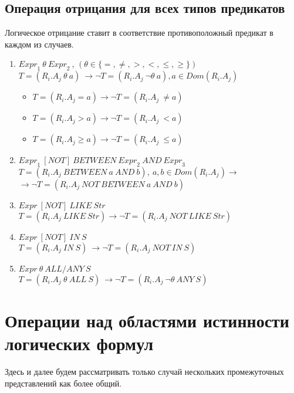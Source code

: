 \documentclass[10pt,a4paper]{article}
\def \n #1{\mathit{#1}}
\begin{document}
\subsection{Операция отрицания для всех типов предикатов}
Логическое отрицание ставит в соответствие противоположный предикат в каждом из случаев.
\begin{enumerate}
  \item $ \n{Expr}_1\ \theta\ \n{Expr}_2\ $, $(\theta \in \{=, \neq, >, <, \leq, \geq\})$\\
  $T = (\n{R_i.A_j}\ \theta\ a)\ \rightarrow \neg T = (\n{R_i.A_j}\ \neg \theta\ a),
  a \in Dom(R_i.A_j)$
    \begin{itemize}
      \item $T = (\n{R_i.A_j} = a) \rightarrow \neg T =  (\n{R_i.A_j}\ \neq a)$
      \item $T = (\n{R_i.A_j} > a) \rightarrow \neg T =  (\n{R_i.A_j}\ < a)$
      \item $T = (\n{R_i.A_j} \geq a) \rightarrow \neg T = (\n{R_i.A_j}\ \leq
      a)$
    \end{itemize}
  \item $\n{Expr}_1\ \n{[NOT]}\ \n{BETWEEN}\ \n{Expr}_2\ \n{AND}\ \n{Expr}_3$\\
  $T = (\n{R_i.A_j}\ \n{BETWEEN}\ a\ \n{AND}\ b),\ a, b \in Dom(R_i.A_j) \rightarrow$\\
  $\rightarrow \neg T = (\n{R_i.A_j}\ \n{NOT}\ \n{BETWEEN}\ a\ \n{AND}\ b)$
  \item $\n{Expr}\ \n{[NOT]}\ \n{LIKE}\ \n{Str}$\\
  $T = (\n{R_i.A_j}\ \n{LIKE}\ \n{Str}) \rightarrow \neg T = (\n{R_i.A_j}\ \n{NOT}\ \n{LIKE}\
  \n{Str})$
  \item $\n{Expr}\ \n{[NOT]}\ \n{IN}\ S$\\
  $T = (\n{R_i.A_j}\ \n{IN}\ S)\ \rightarrow \neg T = (\n{R_i.A_j}\ \n{NOT}\ \n{IN}\ S)$
  \item $\n{Expr}\ \theta\ \n{ALL/ANY}\ S$\\
  $T = (\n{R_i.A_j}\ \theta\ \n{ALL}\ S)\ \rightarrow \neg T = (\n{R_i.A_j}\ \neg \theta\ \n{ANY}\ S
  )$
\end{enumerate}


\section{Операции над областями истинности логических формул}
\label{comparison}
Здесь и далее будем рассматривать только случай нескольких промежуточных
представлений как более общий.
\end{document}

